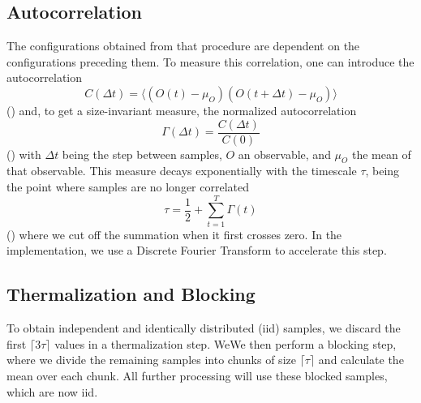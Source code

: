 	\subsection{Autocorrelation}
		The configurations obtained from that procedure are dependent on the configurations preceding them.  To measure this correlation, one can introduce the autocorrelation
		\begin{equation}
			C(\Delta t) = \langle(O(t) - \mu_O)(O(t + \Delta t) - \mu_O) \rangle
		\end{equation}
		(\citet[eq. (41)]{bootstrap}) and, to get a size-invariant measure, the normalized autocorrelation
		\begin{equation}
			\Gamma(\Delta t) = \frac{C(\Delta t)}{C(0)}
		\end{equation}
		(\citet[eq. (43)]{bootstrap}) with $\Delta t$ being the step between samples, $O$ an observable, and $\mu_O$ the mean of that observable. This measure decays exponentially with the timescale $\tau$, being the point where samples are no longer correlated
		\begin{equation}
			\tau = \frac{1}{2} + \sum^{T}_{t=1}{\Gamma(t)}
		\end{equation}
		(\citet[eq. (46)]{bootstrap}) where we cut off the summation when it first crosses zero. In the implementation, we use a Discrete Fourier Transform to accelerate this step.
	
	\subsection{Thermalization and Blocking}\label{sec:blocking}
	To obtain independent and identically distributed (iid) samples, we discard the first $\lceil 3\tau \rceil$ values in a thermalization step. WeWe then perform a blocking step, where we divide the remaining samples into chunks of size $\lceil \tau \rceil$ and calculate the mean over each chunk. All further processing will use these blocked samples, which are now iid.
	
